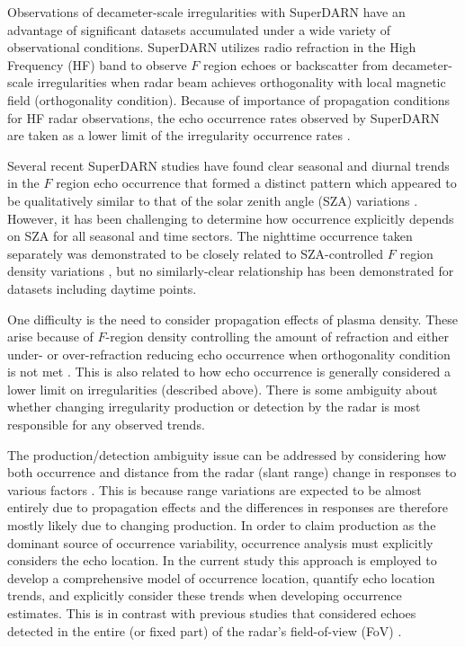 Observations of decameter-scale irregularities with SuperDARN have an advantage of significant datasets accumulated under a wide variety of observational conditions. SuperDARN utilizes radio refraction in the High Frequency (HF) band to observe \(F\) region echoes or backscatter from decameter-scale irregularities when radar beam achieves orthogonality with local magnetic field (orthogonality condition). Because of importance of propagation conditions for HF radar observations, the echo occurrence rates observed by SuperDARN are taken as a lower limit of the irregularity occurrence rates \citep{Chisham2007}.


Several recent SuperDARN studies have found clear seasonal and diurnal trends in the \(F\) region echo occurrence that formed a distinct pattern which appeared to be qualitatively similar to that of the solar zenith angle (SZA) variations \citep{Kane2012,Ghezelbash2014a,Ghezelbash2014b}. However, it has been challenging to determine how occurrence explicitly depends on SZA for all seasonal and time sectors. The nighttime occurrence taken separately was demonstrated to be closely related to SZA-controlled \(F\) region density  variations \citep{Kane2012}, but no similarly-clear relationship has been demonstrated for datasets including daytime points.

One difficulty is the need to consider propagation effects of plasma density. These arise because of \(F\)-region density controlling the amount of refraction and either under- or over-refraction reducing echo occurrence when orthogonality condition is not met \citep{Milan1997,Danskin2002}. This is also related to how echo occurrence is generally considered a lower limit on irregularities (described above). There is some ambiguity about whether changing irregularity production or detection by the radar is most responsible for any observed trends.

The production/detection ambiguity issue can be addressed by considering how both occurrence and distance from the radar (slant range) change in responses to various factors \citep{Kane2012,Ghezelbash2014b}. This is because range variations are expected to be almost entirely due to propagation effects and the differences in responses are therefore mostly likely due to changing production. In order to claim production as the dominant source of occurrence variability, occurrence analysis must explicitly considers the echo location. In the current study this approach is employed to develop a comprehensive model of occurrence location, quantify echo location trends, and explicitly consider these trends when developing occurrence estimates. This is in contrast with previous studies that considered echoes detected in the entire (or fixed part) of the radar's field-of-view (FoV) \citep[e.g.][]{Kumar2011,Kane2012}.

